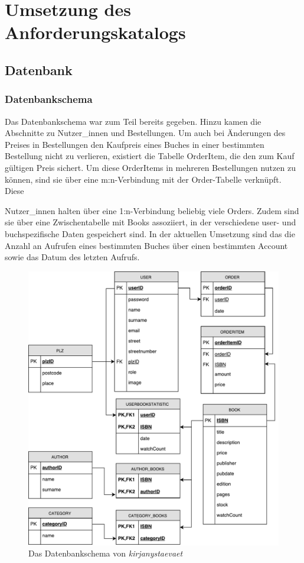 \section{Umsetzung des Anforderungskatalogs}\label{sec:umsetzung}
	\subsection{Datenbank}\label{sec:umsetzung:DB:DBS}
		\subsubsection{Datenbankschema}\label{sec:umsetzung:DB:Schema}
		Das Datenbankschema war zum Teil bereits gegeben. Hinzu kamen die Abschnitte zu Nutzer\_innen und Bestellungen. Um auch bei Änderungen des Preises in Bestellungen den Kaufpreis eines Buches in einer bestimmten Bestellung nicht zu verlieren, existiert die Tabelle OrderItem, die den zum Kauf gültigen Preis sichert. Um diese OrderItems in mehreren Bestellungen nutzen zu können, sind sie über eine m:n-Verbindung mit der Order-Tabelle verknüpft. Diese 
		
		Nutzer\_innen halten über eine 1:n-Verbindung beliebig viele Orders. Zudem sind sie über eine Zwischentabelle mit Books assoziiert, in der verschiedene user- und buchspezifische Daten gespeichert sind. In der aktuellen Umsetzung sind das die Anzahl an Aufrufen eines bestimmten Buches über einen bestimmten Account sowie das Datum des letzten Aufrufs.
	
	
\begin{figure}[h]
\centering
\includegraphics[width=\linewidth]{files/db-schema}
\caption{Das Datenbankschema von \textit{kirjanystaevaet}}
\label{fig:db-schema}
\end{figure}

